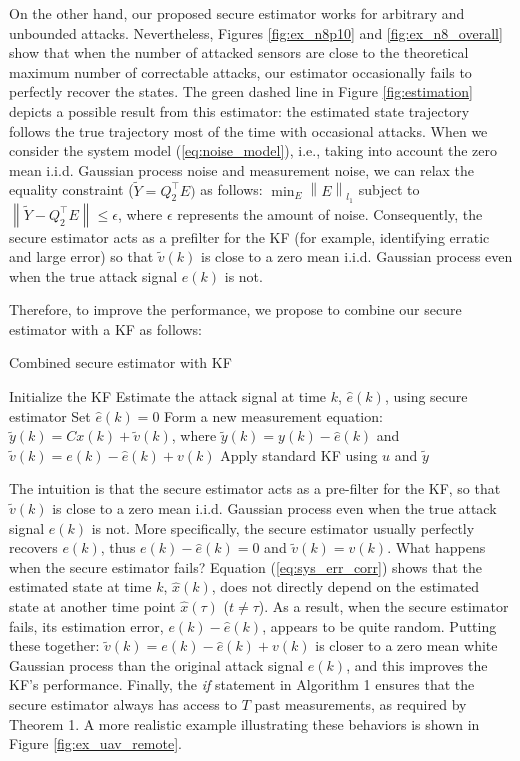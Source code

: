 \documentclass[../../thesis.tex]{subfiles}
\newcommand{\norm}[1]{\left\lVert#1\right\rVert}
\begin{document}
On the other hand, our proposed secure estimator works for arbitrary and unbounded attacks.
Nevertheless, Figures \ref{fig:ex_n8p10} and \ref{fig:ex_n8_overall} show that when the number of attacked sensors are close to the theoretical maximum number of correctable attacks, our estimator occasionally fails to perfectly recover the states.
The green dashed line in Figure \ref{fig:estimation} depicts a possible result from this estimator: the estimated state trajectory follows the true trajectory most of the time with occasional attacks.
When we consider the system model (\ref{eq:noise_model}), i.e., taking into account the zero mean i.i.d. Gaussian process noise and measurement noise, we can relax the equality constraint ($\tilde Y = Q_2 ^\top E)$ as follows: $\min_E \norm{E}_{l_1}$ subject to $\norm { \tilde Y - Q_2^\top E}\le \epsilon$, where $\epsilon$ represents the amount of noise. Consequently, the secure estimator acts as a prefilter for the KF (for example, identifying erratic and large error) so that $\tilde v(k)$ is close to a zero mean i.i.d. Gaussian process even when the true attack signal $e(k)$ is not.

Therefore, to improve the performance, we propose to combine our secure estimator with a KF as follows:
\begin{algorithm}
\caption{Combined secure estimator with KF}
\label{al:se_kf}
\begin{algorithmic}[1]
\State Initialize the KF
		\State Estimate the attack signal at time $k$, $\hat e(k)$, using secure estimator
	\Else
		\State Set $\hat e(k) = 0$
	\EndIf
	\State Form a new measurement equation: $\tilde y(k) =  C x(k) + \tilde v(k)$, where $\tilde y(k) = y(k) - \hat e(k)$ and $ \tilde v(k) = e (k) - \hat e(k) + v(k)$
	\State Apply standard KF using $u$ and $\tilde y$ 
\EndFor
\end{algorithmic}
\end{algorithm}
The intuition is that the secure estimator acts as a pre-filter for the KF, so that $\tilde v(k)$ is close to a zero mean i.i.d. Gaussian process even when the true attack signal $e(k)$ is not. More specifically, the secure estimator usually perfectly recovers $e(k)$, thus $e(k) - \hat e(k) = 0$ and $\tilde v(k) = v(k)$. What happens when the secure estimator fails? Equation (\ref{eq:sys_err_corr}) shows that the estimated state at time $k$, $\hat x(k)$, %
does not directly depend on the estimated state at another time point $\hat x(\tau)$ ($t \neq \tau$). As a result, when the secure estimator fails, its estimation error, $e(k) - \hat e(k)$, appears to be quite random. Putting these together: $\tilde v(k) = e(k) - \hat e(k) + v(k)$ is closer to a zero mean white Gaussian process than the original attack signal $e(k)$, and this improves the KF's performance. 
Finally, the \textit{if} statement in Algorithm 1 ensures that the secure estimator always has access to $T$ past measurements, as required by Theorem 1.
A more realistic example illustrating these behaviors is shown in Figure \ref{fig:ex_uav_remote}.
\end{document}

